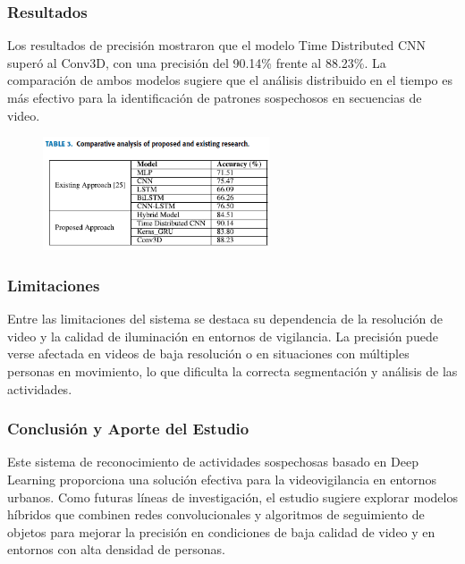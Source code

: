 \subsubsection{Resultados}
Los resultados de precisión mostraron que el modelo Time Distributed CNN superó al Conv3D, con una precisión del 90.14\% frente al 88.23\%. La comparación de ambos modelos sugiere que el análisis distribuido en el tiempo es más efectivo para la identificación de patrones sospechosos en secuencias de video.

\begin{figure}[h] %
    \centering
    \includegraphics[width=0.6\textwidth]{4/re7.png} %
    \label{fig:ejemplo} %
\end{figure}

\subsubsection{Limitaciones}
Entre las limitaciones del sistema se destaca su dependencia de la resolución de video y la calidad de iluminación en entornos de vigilancia. La precisión puede verse afectada en videos de baja resolución o en situaciones con múltiples personas en movimiento, lo que dificulta la correcta segmentación y análisis de las actividades.

\subsubsection{Conclusión y Aporte del Estudio}
Este sistema de reconocimiento de actividades sospechosas basado en Deep Learning proporciona una solución efectiva para la videovigilancia en entornos urbanos. Como futuras líneas de investigación, el estudio sugiere explorar modelos híbridos que combinen redes convolucionales y algoritmos de seguimiento de objetos para mejorar la precisión en condiciones de baja calidad de video y en entornos con alta densidad de personas.



